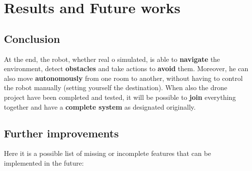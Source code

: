 \chapter{Results and Future works}
\label{cha:futureworks}

\section{Conclusion}

At the end, the robot, whether real o simulated, is able to \textbf{navigate} the environment, detect \textbf{obstacles} and take actions to \textbf{avoid} them. Moreover, he can also move \textbf{autonomously} from one room to another, without having to control the robot manually (setting yourself the destination). When also the drone project have been completed and tested, it will be possible to \textbf{join} everything together and have a \textbf{complete system} as designated originally.

\section{Further improvements}

Here it is a possible list of missing or incomplete features that can be implemented in the future:

